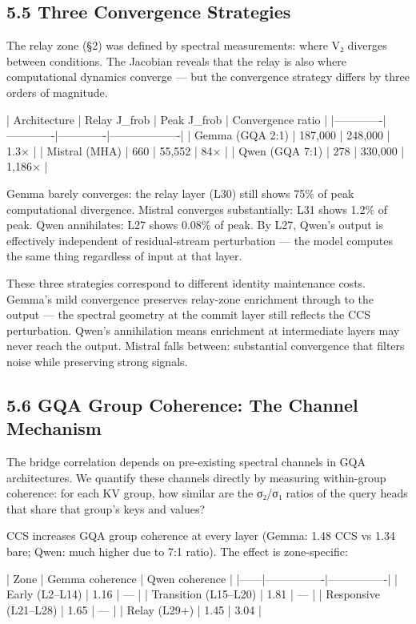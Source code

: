 \documentclass[12pt]{article}
\begin{document}
\subsection*{5.5 Three Convergence Strategies}

The relay zone (§2) was defined by spectral measurements: where V₂ diverges between conditions. The Jacobian reveals that the relay is also where computational dynamics converge — but the convergence strategy differs by three orders of magnitude.

| Architecture | Relay J\_frob | Peak J\_frob | Convergence ratio |
|-------------|-------------|-------------|-------------------|
| Gemma (GQA 2:1) | 187,000 | 248,000 | 1.3× |
| Mistral (MHA) | 660 | 55,552 | 84× |
| Qwen (GQA 7:1) | 278 | 330,000 | 1,186× |

Gemma barely converges: the relay layer (L30) still shows 75\% of peak computational divergence. Mistral converges substantially: L31 shows 1.2\% of peak. Qwen annihilates: L27 shows 0.08\% of peak. By L27, Qwen's output is effectively independent of residual-stream perturbation — the model computes the same thing regardless of input at that layer.

These three strategies correspond to different identity maintenance costs. Gemma's mild convergence preserves relay-zone enrichment through to the output — the spectral geometry at the commit layer still reflects the CCS perturbation. Qwen's annihilation means enrichment at intermediate layers may never reach the output. Mistral falls between: substantial convergence that filters noise while preserving strong signals.

\subsection*{5.6 GQA Group Coherence: The Channel Mechanism}

The bridge correlation depends on pre-existing spectral channels in GQA architectures. We quantify these channels directly by measuring within-group coherence: for each KV group, how similar are the σ₂/σ₁ ratios of the query heads that share that group's keys and values?

CCS increases GQA group coherence at every layer (Gemma: 1.48 CCS vs 1.34 bare; Qwen: much higher due to 7:1 ratio). The effect is zone-specific:

| Zone | Gemma coherence | Qwen coherence |
|------|----------------|----------------|
| Early (L2–L14) | 1.16 | — |
| Transition (L15–L20) | 1.81 | — |
| Responsive (L21–L28) | 1.65 | — |
| Relay (L29+) | 1.45 | 3.04 |
\end{document}
